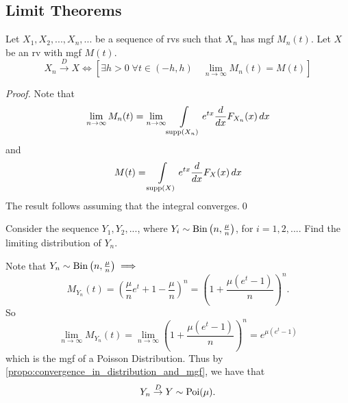 \documentclass[notoc,notitlepage]{tufte-book}
\newcommand{\convd}{\overset{D}{\to}}
\begin{document}

\subsection{Limit Theorems}%
\label{sub:limit_theorems}

\begin{propo}
\label{propo:convergence_in_distribution_and_mgf}
Let $X_1, X_2, ..., X_n, ...$ be a sequence of rvs such that $X_n$ has mgf $M_n(t)$. Let $X$ be an rv with mgf $M(t)$.
\begin{equation*}
  X_n \convd X \iff \left[ \exists h > 0 \; \forall t \in (-h, h) \quad \lim_{n \to \infty} M_n(t) = M(t) \right]
\end{equation*}
\end{propo}

\begin{proof}
  Note that
  \begin{equation*}
    \lim_{n \to \infty} M_n(t) = \lim_{n \to \infty} \int\limits_{\operatorname{supp}(X_n)} e^{tx} \frac{d}{dx} F_{X_n} (x) \mathop{}\!d{x} 
  \end{equation*}
  and
  \begin{equation*}
    M(t) = \int\limits_{\operatorname{supp}(X)} e^{tx} \frac{d}{dx} F_X(x) \mathop{}\!d{x} 
  \end{equation*}
  The result follows assuming that the integral converges.\qed
\end{proof}

\begin{eg}
  Consider the sequence $Y_1, Y_2, ...$, where $Y_i \sim \operatorname{Bin}\left(n , \frac{\mu}{n}\right)$, for $i = 1, 2, ...$. Find the limiting distribution of $Y_n$.
\end{eg}

\begin{solution}[Example 5.6]
  Note that $Y_n \sim \operatorname{Bin}\left(n, \frac{\mu}{n}\right) \implies$
  \begin{equation*}
    M_{Y_n}(t) = \left( \frac{\mu}{n} e^t + 1 - \frac{\mu}{n}\right)^n = \left( 1 + \frac{\mu \left( e^t - 1 \right)}{n} \right)^n.
  \end{equation*}
  So
  \begin{equation*}
    \lim_{n \to \infty} M_{Y_n}(t) = \lim_{n \to \infty} \left( 1 + \frac{\mu \left( e^t - 1 \right)}{n} \right)^n = e^{\mu \left(e^t - 1\right)}
  \end{equation*}
  which is the mgf of a Poisson Distribution. Thus by \cref{propo:convergence_in_distribution_and_mgf}, we have that
  \begin{equation*}
    Y_n \convd Y \sim \Poi(\mu).
  \end{equation*}
\end{solution}
\end{document}
